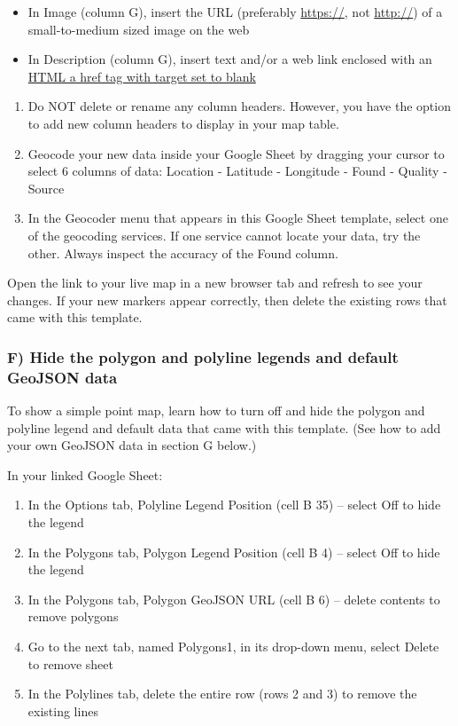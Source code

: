 \documentclass[
  english,
]{book}
\providecommand{\tightlist}{%
  \setlength{\itemsep}{0pt}\setlength{\parskip}{0pt}}
\begin{document}
\begin{itemize}
\tightlist
\item
  In Image (column G), insert the URL (preferably \url{https://}, not \url{http://}) of a small-to-medium sized image on the web
\item
  In Description (column G), insert text and/or a web link enclosed with an \href{https://www.w3schools.com/tags/tag_a.asp}{HTML a href tag with target set to blank}
\end{itemize}

\begin{enumerate}
\def\labelenumi{\arabic{enumi})}
\setcounter{enumi}{7}
\item
  Do NOT delete or rename any column headers. However, you have the option to add new column headers to display in your map table.
\item
  Geocode your new data inside your Google Sheet by dragging your cursor to select 6 columns of data: Location - Latitude - Longitude - Found - Quality - Source
\item
  In the Geocoder menu that appears in this Google Sheet template, select one of the geocoding services. If one service cannot locate your data, try the other. Always inspect the accuracy of the Found column.
\end{enumerate}

Open the link to your live map in a new browser tab and refresh to see your changes. If your new markers appear correctly, then delete the existing rows that came with this template.

\hypertarget{f-hide-the-polygon-and-polyline-legends-and-default-geojson-data}{%
\subsubsection*{F) Hide the polygon and polyline legends and default GeoJSON data}\label{f-hide-the-polygon-and-polyline-legends-and-default-geojson-data}}

To show a simple point map, learn how to turn off and hide the polygon and polyline legend and default data that came with this template. (See how to add your own GeoJSON data in section G below.)

In your linked Google Sheet:

\begin{enumerate}
\def\labelenumi{\arabic{enumi})}
\item
  In the Options tab, Polyline Legend Position (cell B 35) -- select Off to hide the legend
\item
  In the Polygons tab, Polygon Legend Position (cell B 4) -- select Off to hide the legend
\item
  In the Polygons tab, Polygon GeoJSON URL (cell B 6) -- delete contents to remove polygons
\item
  Go to the next tab, named Polygons1, in its drop-down menu, select Delete to remove sheet
\item
  In the Polylines tab, delete the entire row (rows 2 and 3) to remove the existing lines
\end{enumerate}
\end{document}
